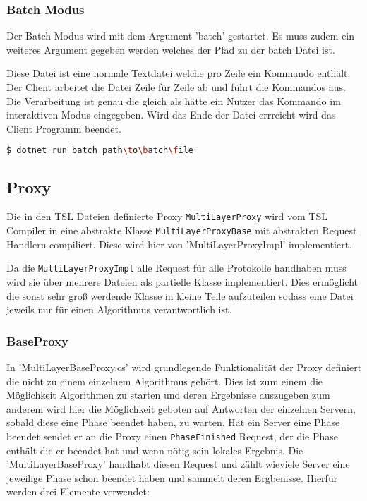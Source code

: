\subsubsection{Batch Modus}
 Der Batch Modus wird mit dem Argument 'batch' gestartet. Es muss zudem ein weiteres Argument gegeben werden welches der Pfad zu der batch Datei ist.

 Diese Datei ist eine normale Textdatei welche pro Zeile ein Kommando enthält. Der Client arbeitet die Datei Zeile für Zeile ab und führt die Kommandos aus.
 Die Verarbeitung ist genau die gleich als hätte ein Nutzer das Kommando im interaktiven Modus eingegeben. Wird das Ende der Datei errreicht wird das Client Programm beendet.

\begin{lstlisting}[language=bash]
  $ dotnet run batch path\to\batch\file 
\end{lstlisting}


\subsection{Proxy}



Die in den TSL Dateien definierte Proxy \verb|MultiLayerProxy| wird vom TSL Compiler in eine abstrakte Klasse \verb|MultiLayerProxyBase| mit abstrakten Request Handlern compiliert. Diese wird hier von 'MultiLayerProxyImpl' implementiert.

Da die \verb|MultiLayerProxyImpl| alle Request für alle Protokolle handhaben muss wird sie über mehrere Dateien als partielle Klasse implementiert. Dies ermöglicht die sonst sehr groß werdende Klasse in kleine Teile aufzuteilen sodass eine Datei jeweils nur für einen Algorithmus verantwortlich ist.

\subsubsection{BaseProxy}

In 'MultiLayerBaseProxy.cs' wird grundlegende Funktionalität der Proxy definiert die nicht zu einem einzelnem Algorithmus gehört. Dies ist zum einem die Möglichkeit Algorithmen zu starten und deren Ergebnisse auszugeben zum anderem wird hier die Möglichkeit geboten auf Antworten der einzelnen Servern, sobald diese eine Phase beendet haben, zu warten.
Hat ein Server eine Phase beendet sendet er an die Proxy einen \verb|PhaseFinished| Request, der die Phase enthält die er beendet hat und wenn nötig sein lokales Ergebnis. Die 'MultiLayerBaseProxy' handhabt diesen Request und zählt wieviele Server eine jeweilige Phase schon beendet haben und sammelt deren Ergbenisse. Hierfür werden drei Elemente verwendet:

